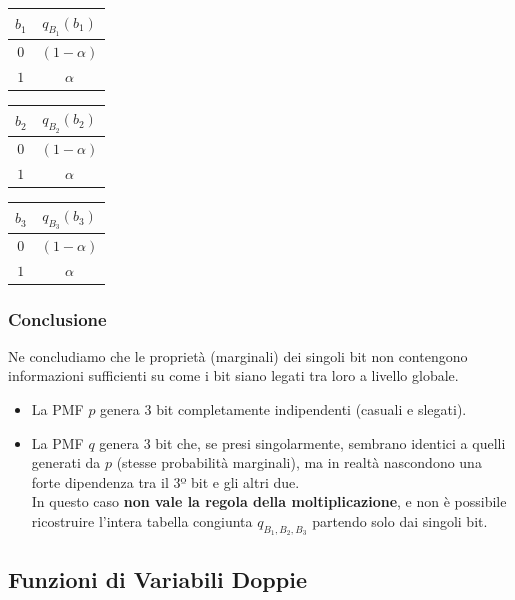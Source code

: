 \begin{center}
    \begin{tabular}{|c|c|}
        \hline
        $b_1$ & $q_{B_1}(b_1)$ \\
        \hline
        $0$ & $(1-\alpha)$ \\
        $1$ & $\alpha$ \\
        \hline
    \end{tabular}
    \quad\quad
    \begin{tabular}{|c|c|}
        \hline
        $b_2$ & $q_{B_2}(b_2)$ \\
        \hline
        $0$ & $(1-\alpha)$ \\
        $1$ & $\alpha$ \\
        \hline
    \end{tabular}
    \quad\quad
    \begin{tabular}{|c|c|}
        \hline
        $b_3$ & $q_{B_3}(b_3)$ \\
        \hline
        $0$ & $(1-\alpha)$ \\
        $1$ & $\alpha$ \\
        \hline
    \end{tabular}
\end{center}

\subsubsection{Conclusione}
Ne concludiamo che le proprietà (marginali) dei singoli bit non contengono informazioni sufficienti su come i bit siano legati tra loro a livello globale.
\begin{itemize}
    \item La PMF $p$ genera 3 bit completamente indipendenti (casuali e slegati).
    \item La PMF $q$ genera 3 bit che, se presi singolarmente, sembrano identici a quelli generati da $p$ (stesse probabilità marginali), ma in realtà nascondono una forte dipendenza tra il 3º bit e gli altri due. 
    \\In questo caso \textbf{non vale la regola della moltiplicazione}, e non è possibile ricostruire l'intera tabella congiunta $q_{B_1,B_2,B_3}$ partendo solo dai singoli bit.
\end{itemize}

\subsection{Funzioni di Variabili Doppie}

